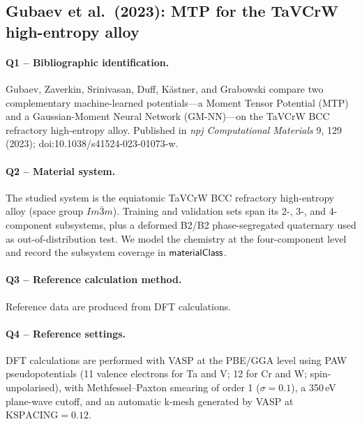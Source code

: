 \subsection{Gubaev et al.\ (2023): MTP for the TaVCrW high-entropy alloy}
\label{sec:appendix-example-gubaev2023}

\paragraph{Q1 -- Bibliographic identification.}
Gubaev, Zaverkin, Srinivasan, Duff, K\"astner, and Grabowski compare
two complementary machine-learned potentials---a Moment Tensor
Potential (MTP) and a Gaussian-Moment Neural Network (GM-NN)---on the
TaVCrW BCC refractory high-entropy alloy. Published in \emph{npj
Computational Materials} 9, 129 (2023);
doi:10.1038/s41524-023-01073-w.


\paragraph{Q2 -- Material system.}
The studied system is the equiatomic TaVCrW BCC refractory high-entropy
alloy (space group $Im\bar{3}m$). Training and validation sets span
its 2-, 3-, and 4-component subsystems, plus a deformed B2/B2
phase-segregated quaternary used as out-of-distribution test. We
model the chemistry at the four-component level and record the
subsystem coverage in $\mathsf{materialClass}$.


\paragraph{Q3 -- Reference calculation method.}
Reference data are produced from DFT calculations.


\paragraph{Q4 -- Reference settings.}
DFT calculations are performed with VASP at the PBE/GGA level using
PAW pseudopotentials (11 valence electrons for Ta and V; 12 for Cr
and W; spin-unpolarised), with Methfessel--Paxton smearing of order 1
($\sigma=0.1$), a 350\,eV plane-wave cutoff, and an automatic k-mesh
generated by VASP at $\text{KSPACING}=0.12$.



